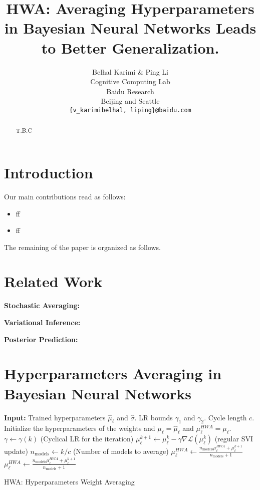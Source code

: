 \documentclass{article} %
\title{HWA: Averaging Hyperparameters in Bayesian Neural Networks Leads to Better Generalization.}
\author{Belhal Karimi \& Ping Li \\
Cognitive Computing Lab\\
Baidu Research\\
Beijing and Seattle \\
\texttt{\{v_karimibelhal, liping\}@baidu.com} \\
}
\begin{document}
\maketitle

\begin{abstract}
T.B.C
\end{abstract}

\section{Introduction}


Our main contributions read as follows:
\begin{itemize}
\item ff 
\item ff 
\end{itemize}

The remaining of the paper is organized as follows.
 
\section{Related Work}
\textbf{Stochastic Averaging:}

\textbf{Variational Inference:}

\textbf{Posterior Prediction:}

\section{Hyperparameters Averaging in Bayesian Neural Networks}

\begin{algorithm}[H]
\begin{algorithmic}[1]
\STATE \textbf{Input:} Trained hyperparameters $\hat{\mu}_{\ell}$ and $\hat{\sigma}$. LR bounds $\gamma_1$ and $\gamma_2$. Cycle length $c$.
\STATE Initialize the hyperparameters of the weights and 
$\mu_{\ell} = \hat{\mu}_{\ell}$ and $\mu^{HWA}_{\ell} = \mu_{\ell}$.
\STATE $\gamma \leftarrow \gamma(k)$ (Cyclical LR for the iteration)
\STATE $\mu_{\ell}^{k+1} \leftarrow \mu_{\ell}^{k} - \gamma \nabla \mathcal{L}(\mu_{\ell}^{k})$ (regular SVI update)
	\STATE $n_{\textrm{models}} \leftarrow k/c$ (Number of models to average)
		\STATE $\mu_{\ell}^{HWA} \leftarrow \frac{n_{\textrm{models}}\mu_{\ell}^{HWA} + \mu_{\ell}^{k+1}}{n_{\textrm{models}}+1}$
		\STATE $\mu_{\ell}^{HWA} \leftarrow \frac{n_{\textrm{models}}\mu_{\ell}^{HWA} + \mu_{\ell}^{k+1}}{n_{\textrm{models}}+1}$
\ENDIF
\ENDFOR
\end{algorithmic}
\caption{HWA: Hyperparameters Weight Averaging}
\label{alg:miso}
        \end{algorithm}
\end{document}
